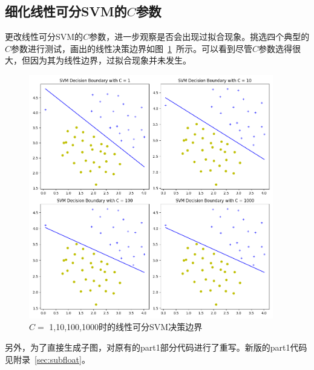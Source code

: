\documentclass{SEU-AI-Report}
\begin{document}
\subsection{细化线性可分SVM的$C$参数}
更改线性可分SVM的$C$参数，进一步观察是否会出现过拟合现象。挑选四个典型的$C$参数进行测试，画出的线性决策边界如图~\ref{fig:linear4}~所示。可以看到尽管$C$参数选得很大，但因为其为线性边界，过拟合现象并未发生。
\begin{figure}[htbp]
    \centering
    \includegraphics[width=0.95\textwidth]{figure/svm.png}
    \caption{$C =$ 1,10,100,1000时的线性可分SVM决策边界}
    \label{fig:linear4}
\end{figure}

另外，为了直接生成子图，对原有的part1部分代码进行了重写。新版的part1代码见附录~\ref{sec:subfloat}。
\end{document}
